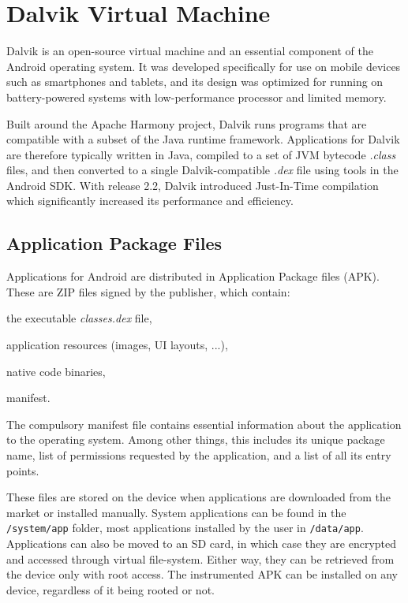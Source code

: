 \documentclass[12pt,twoside,notitlepage]{report}
\begin{document}
\section{Dalvik Virtual Machine}

Dalvik is an open-source virtual machine and an essential component of the Android operating system. It was developed specifically for use on mobile devices such as smartphones and tablets, and its design was optimized for running on battery-powered systems with low-performance processor and limited memory. 

Built around the Apache Harmony project, Dalvik runs programs that are compatible with a subset of the Java runtime framework. Applications for Dalvik are therefore typically written in Java, compiled to a set of JVM bytecode \emph{.class} files, and then converted to a single Dalvik-compatible \emph{.dex} file using tools in the Android SDK. With release 2.2, Dalvik introduced Just-In-Time compilation which significantly increased its performance and efficiency\cite{web:DalvikJit}.

\subsection{Application Package Files}

Applications for Android are distributed in Application Package files (APK). These are ZIP files signed by the publisher, which contain:
\begin{inparaenum}[(i)]
\item the executable \emph{classes.dex} file,
\item application resources (images, UI layouts, ...),
\item native code binaries,
\item manifest.
\end{inparaenum}

The compulsory manifest file contains essential information about the application to the operating system. Among other things, this includes its unique package name, list of permissions requested by the application, and a list of all its entry points.

These files are stored on the device when applications are downloaded from the market or installed manually. System applications can be found in the \verb$/system/app$ folder, most applications installed by the user in \verb$/data/app$. Applications can also be moved to an SD card, in which case they are encrypted and accessed through virtual file-system. Either way, they can be retrieved from the device only with root access. The instrumented APK can be installed on any device, regardless of it being rooted or not. 
\end{document}
